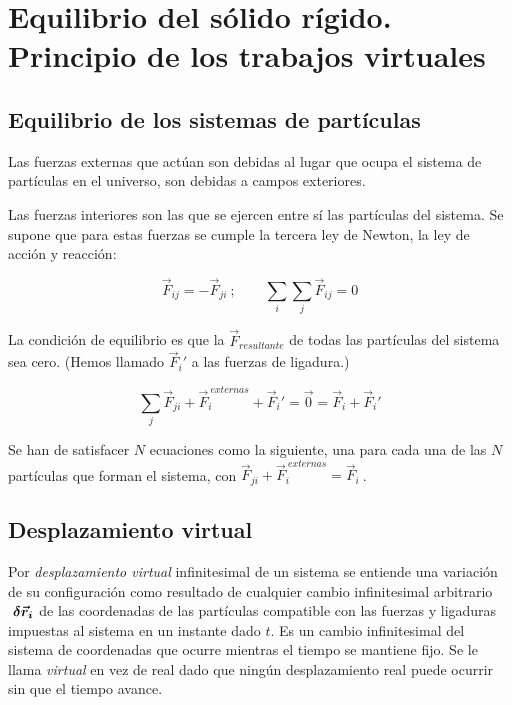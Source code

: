 \chapter{Equilibrio del sólido rígido. Principio de los trabajos virtuales}	

\section{Equilibrio de los sistemas de partículas}

Las fuerzas externas que actúan son debidas al lugar que ocupa el sistema de partículas en el universo, son debidas a campos exteriores.

Las fuerzas interiores son las que se ejercen entre sí las partículas del sistema. Se supone que para estas fuerzas se cumple la tercera ley de Newton, la ley de acción y reacción:

$$ \overrightarrow{F}_{ij}=- \overrightarrow{F}_{ji} \ ; \qquad \sum_i \sum_j  \overrightarrow{F}_{ij}=0 $$

La condición de equilibrio es que la  $\overrightarrow{F}_{resultante}$ de todas las partículas del sistema sea cero. (Hemos llamado $\overrightarrow{F}_i' $ a las fuerzas de ligadura.)

$$\sum_j  \overrightarrow{F}_{ji} +  \overrightarrow{F}_i^{\ externas}+  \overrightarrow{F}_i'=\vec 0= \overrightarrow{F}_i+ \overrightarrow{F}_i'$$


Se han de satisfacer $N$ ecuaciones como la siguiente, una para cada una de las $N$ partículas que forman el sistema, con $\overrightarrow{F}_{ji} +  \overrightarrow{F}_i^{\ externas}=\overrightarrow{F}_i\ $. 

\section{Desplazamiento virtual}

Por \emph{desplazamiento virtual} infinitesimal de un sistema se entiende una variación de su configuración como resultado de cualquier cambio infinitesimal arbitrario $\ \boldsymbol{\var \vec r_i} \ $de las coordenadas de las partículas compatible con las fuerzas y ligaduras impuestas al sistema en un instante dado $ t $. Es un cambio infinitesimal del sistema de coordenadas que ocurre mientras el tiempo se mantiene fijo. Se le llama \emph{virtual} en vez de real dado que ningún desplazamiento real puede ocurrir sin que el tiempo avance.



